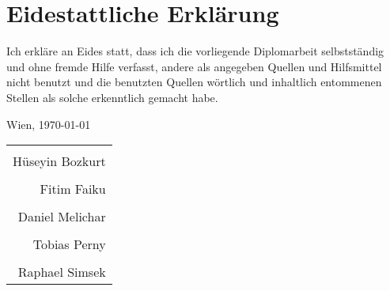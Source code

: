 \section*{Eidestattliche Erklärung}
Ich erkläre an Eides statt, dass ich die vorliegende Diplomarbeit selbstständig und ohne fremde Hilfe verfasst, andere als angegeben Quellen und Hilfsmittel nicht benutzt und die benutzten Quellen wörtlich und inhaltlich entommenen Stellen als solche erkenntlich gemacht habe.

\vspace{0.5cm}

Wien, \today

\vspace{1.5cm}


\begin{flushright}
	\begin{tabular}{r}
	 \makebox[2.5in]{\hrulefill}\\
	 Hüseyin Bozkurt\\[8ex]
	 \makebox[2.5in]{\hrulefill}\\
	 Fitim Faiku\\[8ex]
	 \makebox[2.5in]{\hrulefill}\\
	 Daniel Melichar\\[8ex]
	 \makebox[2.5in]{\hrulefill}\\
	 Tobias Perny\\[8ex]
	 \makebox[2.5in]{\hrulefill}\\
	 Raphael Simsek\\[8ex]
	\end{tabular}
\end{flushright}